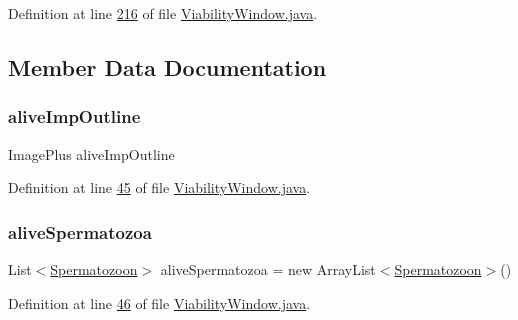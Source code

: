 Definition at line \hyperlink{_viability_window_8java_source_l00216}{216} of file \hyperlink{_viability_window_8java_source}{Viability\+Window.\+java}.



\subsection{Member Data Documentation}
\hypertarget{classgui_1_1_viability_window_ada3e873f306d92d8af66896d5395e2c4}{}\label{classgui_1_1_viability_window_ada3e873f306d92d8af66896d5395e2c4} 
\subsubsection{\texorpdfstring{alive\+Imp\+Outline}{aliveImpOutline}}
{\footnotesize\ttfamily Image\+Plus alive\+Imp\+Outline\hspace{0.3cm}{\ttfamily [private]}}



Definition at line \hyperlink{_viability_window_8java_source_l00045}{45} of file \hyperlink{_viability_window_8java_source}{Viability\+Window.\+java}.

\hypertarget{classgui_1_1_viability_window_a3990fd3a99cde29eac35061c41b3434b}{}\label{classgui_1_1_viability_window_a3990fd3a99cde29eac35061c41b3434b} 
\subsubsection{\texorpdfstring{alive\+Spermatozoa}{aliveSpermatozoa}}
{\footnotesize\ttfamily List$<$\hyperlink{classdata_1_1_spermatozoon}{Spermatozoon}$>$ alive\+Spermatozoa = new Array\+List$<$\hyperlink{classdata_1_1_spermatozoon}{Spermatozoon}$>$()\hspace{0.3cm}{\ttfamily [protected]}}



Definition at line \hyperlink{_viability_window_8java_source_l00046}{46} of file \hyperlink{_viability_window_8java_source}{Viability\+Window.\+java}.

\hypertarget{classgui_1_1_viability_window_aeb170129564baee9da9b1f064753420c}{}\label{classgui_1_1_viability_window_aeb170129564baee9da9b1f064753420c} 

